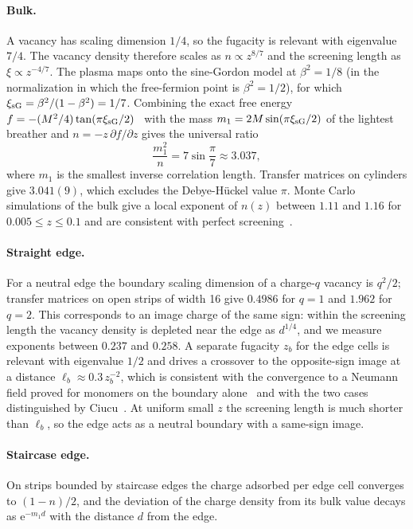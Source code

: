 \documentclass[reprint,aps,pre,superscriptaddress,longbibliography,floatfix,amsmath,amssymb]{revtex4-2}
\newcommand{\ee}{\mathrm{e}}
\begin{document}
\paragraph*{Bulk.} A vacancy has scaling dimension $1/4$, so the fugacity is relevant with eigenvalue $7/4$. The vacancy density therefore scales as $n\propto z^{8/7}$ and the screening length as $\xi\propto z^{-4/7}$. The plasma maps onto the sine-Gordon model at $\beta^2=1/8$ (in the normalization in which the free-fermion point is $\beta^2=1/2$), for which $\xi_{\rm sG}=\beta^2/(1-\beta^2)=1/7$. Combining the exact free energy $f=-(M^2/4)\tan(\pi\xi_{\rm sG}/2)$~\cite{TODO-destri1991,TODO-zamolodchikov1995} with the mass $m_1=2M\sin(\pi\xi_{\rm sG}/2)$ of the lightest breather and $n=-z\,\partial f/\partial z$ gives the universal ratio
\begin{equation}
  \frac{m_1^2}{n}=7\sin\frac{\pi}{7}\approx3.037 ,
\end{equation}
where $m_1$ is the smallest inverse correlation length. Transfer matrices on cylinders give $3.041(9)$, which excludes the Debye-H\"uckel value $\pi$. Monte Carlo simulations of the bulk give a local exponent of $n(z)$ between $1.11$ and $1.16$ for $0.005\le z\le0.1$ and are consistent with perfect screening~\cite{TODO-stillinger1968}.

\paragraph*{Straight edge.} For a neutral edge the boundary scaling dimension of a charge-$q$ vacancy is $q^2/2$; transfer matrices on open strips of width 16 give $0.4986$ for $q=1$ and $1.962$ for $q=2$. This corresponds to an image charge of the same sign: within the screening length the vacancy density is depleted near the edge as $d^{1/4}$, and we measure exponents between $0.237$ and $0.258$. A separate fugacity $z_b$ for the edge cells is relevant with eigenvalue $1/2$ and drives a crossover to the opposite-sign image at a distance $\ell_b\approx0.3\,z_b^{-2}$, which is consistent with the convergence to a Neumann field proved for monomers on the boundary alone~\cite{berestycki2023} and with the two cases distinguished by Ciucu~\cite{ciucu2014}. At uniform small $z$ the screening length is much shorter than $\ell_b$, so the edge acts as a neutral boundary with a same-sign image.

\paragraph*{Staircase edge.} On strips bounded by staircase edges the charge adsorbed per edge cell converges to $(1-n)/2$, and the deviation of the charge density from its bulk value decays as $\ee^{-m_1d}$ with the distance $d$ from the edge.
\end{document}
